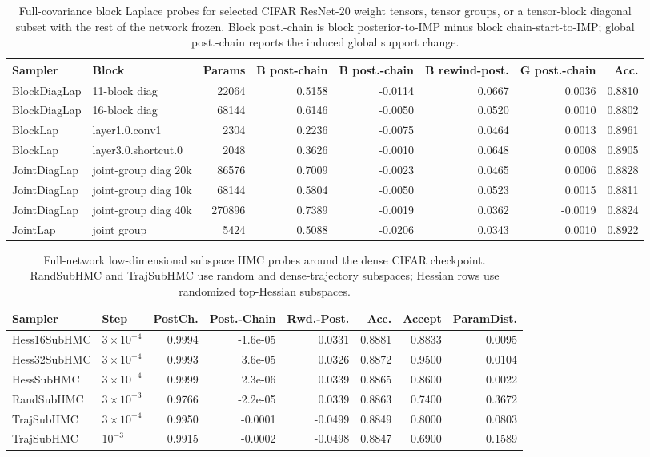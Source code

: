 \begin{table}[t]
\centering
\footnotesize
\setlength{\tabcolsep}{3pt}
\begin{tabular}{llrrrrrr}
\toprule
Sampler & Block & Params & B post-chain & B post.-chain & B rewind-post. & G post.-chain & Acc. \\
\midrule
BlockDiagLap & 11-block diag & 22064 & 0.5158 & -0.0114 & 0.0667 & 0.0036 & 0.8810 \\
BlockDiagLap & 16-block diag & 68144 & 0.6146 & -0.0050 & 0.0520 & 0.0010 & 0.8802 \\
BlockLap & layer1.0.conv1 & 2304 & 0.2236 & -0.0075 & 0.0464 & 0.0013 & 0.8961 \\
BlockLap & layer3.0.shortcut.0 & 2048 & 0.3626 & -0.0010 & 0.0648 & 0.0008 & 0.8905 \\
JointDiagLap & joint-group diag 20k & 86576 & 0.7009 & -0.0023 & 0.0465 & 0.0006 & 0.8828 \\
JointDiagLap & joint-group diag 10k & 68144 & 0.5804 & -0.0050 & 0.0523 & 0.0015 & 0.8811 \\
JointDiagLap & joint-group diag 40k & 270896 & 0.7389 & -0.0019 & 0.0362 & -0.0019 & 0.8824 \\
JointLap & joint group & 5424 & 0.5088 & -0.0206 & 0.0343 & 0.0010 & 0.8922 \\
\bottomrule
\end{tabular}
\caption{Full-covariance block Laplace probes for selected CIFAR
ResNet-20 weight tensors, tensor groups, or a tensor-block
diagonal subset with the rest of the network frozen.
Block post.-chain is block posterior-to-IMP minus block
chain-start-to-IMP; global post.-chain reports the induced global
support change.}
\label{tab:cifar-block-laplace-stats}
\end{table}

\begin{table}[t]
\centering
\scriptsize
\setlength{\tabcolsep}{2pt}
\begin{tabular}{llrrrrrr}
\toprule
Sampler & Step & PostCh. & Post.-Chain & Rwd.-Post. & Acc. & Accept & ParamDist. \\
\midrule
Hess16SubHMC & $3\times 10^{-4}$ & 0.9994 & -1.6e-05 & 0.0331 & 0.8881 & 0.8833 & 0.0095 \\
Hess32SubHMC & $3\times 10^{-4}$ & 0.9993 & 3.6e-05 & 0.0326 & 0.8872 & 0.9500 & 0.0104 \\
HessSubHMC & $3\times 10^{-4}$ & 0.9999 & 2.3e-06 & 0.0339 & 0.8865 & 0.8600 & 0.0022 \\
RandSubHMC & $3\times 10^{-3}$ & 0.9766 & -2.2e-05 & 0.0339 & 0.8863 & 0.7400 & 0.3672 \\
TrajSubHMC & $3\times 10^{-4}$ & 0.9950 & -0.0001 & -0.0499 & 0.8849 & 0.8000 & 0.0803 \\
TrajSubHMC & $10^{-3}$ & 0.9915 & -0.0002 & -0.0498 & 0.8847 & 0.6900 & 0.1589 \\
\bottomrule
\end{tabular}
\caption{Full-network low-dimensional subspace HMC probes around
the dense CIFAR checkpoint. RandSubHMC and TrajSubHMC use
random and dense-trajectory subspaces; Hessian rows use randomized
top-Hessian subspaces.}
\label{tab:cifar-subspace-hmc-stats}
\end{table}

